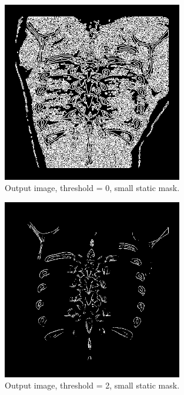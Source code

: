 \documentclass[a4paper,10pt]{article}
\begin{document}
\begin{figure}[H]
  \caption{Output image, threshold = 0, small static mask.}
  \centering
    \includegraphics[width=0.7\textwidth]{out2.png}
\end{figure}

\begin{figure}[H]
  \caption{Output image, threshold = 2, small static mask.}
  \centering
    \includegraphics[width=0.7\textwidth]{out3.png}
\end{figure}
\end{document}
